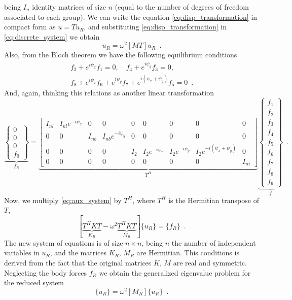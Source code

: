 being $I_{n}$ identity matrices of size $n$ (equal to the number of degrees of freedom associated to each group). We can write the equation \eqref{eq:disp_transformation} in compact form as $u = Tu_R$, and substituting \eqref{eq:disp_transformation} in \eqref{eq:discrete_system} we obtain
\begin{equation}
[KT]{u_R} = \omega^2[MT]{u_R} \enspace .
\label{eq:aux_system}
\end{equation}
Also, from the Bloch theorem we have the following equilibrium conditions
\begin{align*}
f_2 + e^{i \psi_x}f_1=0, \quad f_4 + e^{i \psi_y}f_3=0 , \\
f_8 + e^{i \psi_x}f_6 + e^{i \psi_y}f_7 +e^{i (\psi_x + \psi_y)}f_5 = 0 \enspace .
\end{align*}
And, again, thinking this relations as another linear transformation
\begin{equation}
\underbrace{\left\lbrace  \begin{array}{c}
0 \\ 
0 \\ 
0 \\ 
f_9 
\end{array}  \right\rbrace }_{f_R} = 
\underbrace{\left[ \begin{array}{ccccccccc}
I_{nl} & I_{nl} e^{-i\psi_x} & 0 & 0 & 0 & 0 & 0 & 0 & 0 \\ 
0 & 0 & I_{nb} & I_{nb} e^{-i\psi_y} & 0 & 0 & 0 & 0 & 0 \\ 
0 & 0 & 0 & 0 & I_{2} & I_{2} e^{-i\psi_x} & I_{2} e^{-i\psi_y} & I_{2} e^{-i(\psi_x+\psi_y)} & 0 \\ 
0 & 0 & 0 & 0 & 0 & 0 & 0 & 0 & I_{ni} 
\end{array}  \right] }_{T^H}
\underbrace{\left\lbrace \begin{array}{c}
f_1 \\ 
f_2 \\ 
f_3 \\ 
f_4 \\ 
f_5 \\ 
f_6 \\ 
f_7 \\ 
f_8 \\ 
f_9
\end{array} 
\right\rbrace }_{f} \enspace .
\label{eq:force_transformation}
\end{equation}
Now, we multiply \eqref{eq:aux_system} by $T^H$, where $T^H$ is the Hermitian transpose of $T$,
\begin{equation}
\left[\underbrace{T^HKT}_{K_R} - \omega^2\underbrace{T^HKT}_{M_R} \right] \lbrace u_R\rbrace = \lbrace f_R\rbrace \enspace .
\label{eq:transfo_bloch}
\end{equation}
The new system of equations is of size $n\times n$, being $n$ the number of independent variables in  $u_R$, and the matrices  $K_R$, $M_R$ are Hermitian. This conditions is derived from the fact that the original matrices $K$, $M$ are real and symmetric. Neglecting the body forces $f_R$ we obtain the generalized eigenvalue problem for the reduced system
\begin{equation}
[K_R]\lbrace u_R\rbrace = \omega^2 [M_R] \lbrace u_R\rbrace \enspace .
\end{equation}

